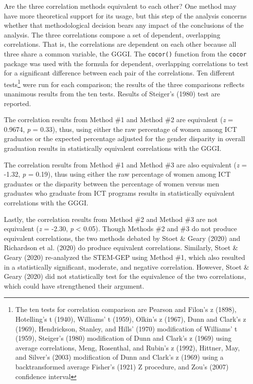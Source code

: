\documentclass[]{book}
\begin{document}
Are the three correlation methods equivalent to each other? One method
may have more theoretical support for its usage, but this step of the
analysis concerns whether that methodological decision bears any impact
of the conclusions of the analysis. The three correlations compose a set
of dependent, overlapping correlations. That is, the correlations are
dependent on each other because all three share a common variable, the
GGGI. The \texttt{cocor()} function from the \texttt{cocor} package
\citep{diedenhofenCocorComprehensiveSolution2015} was used with the
formula for dependent, overlapping correlations to test for a
significant difference between each pair of the correlations. Ten
different tests\footnote{The ten tests for correlation comparison are
  Pearson and Filon's z (1898), Hotelling's t (1940), Williams' t
  (1959), Olkin's z (1967), Dunn and Clark's z (1969), Hendrickson,
  Stanley, and Hills' (1970) modification of Williams' t (1959),
  Steiger's (1980) modification of Dunn and Clark's z (1969) using
  average correlations, Meng, Rosenthal, and Rubin's z (1992), Hittner,
  May, and Silver's (2003) modification of Dunn and Clark's z (1969)
  using a backtransformed average Fisher's (1921) Z procedure, and Zou's
  (2007) confidence interval} were run for each comparison; the results
of the three comparisons reflects unanimous results from the ten tests.
Results of Steiger's (1980) test are reported.

The correlation results from Method \#1 and Method \#2 are equivalent
(\emph{z} = 0.9674, \emph{p} = 0.33), thus, using either the raw
percentage of women among ICT graduates or the expected percentage
adjusted for the gender disparity in overall graduation results in
statistically equivalent correlations with the GGGI.

The correlation results from Method \#1 and Method \#3 are also
equivalent (\emph{z} = -1.32, \emph{p} = 0.19), thus using either the
raw percentage of women among ICT graduates or the disparity between the
percentage of women versus men graduates who graduate from ICT programs
results in statistically equivalent correlations with the GGGI.

Lastly, the correlation results from Method \#2 and Method \#3 are not
equivalent (\emph{z} = -2.30, \emph{p} \textless{} 0.05). Though Methods
\#2 and \#3 do not produce equivalent correlations, the two methods
debated by Stoet \& Geary (2020) and Richardson et al. (2020) do produce
equivalent correlations. Similarly, Stoet \& Geary (2020) re-analyzed
the STEM-GEP using Method \#1, which also resulted in a statistically
significant, moderate, and negative correlation. However, Stoet \& Geary
(2020) did not statistically test for the equivalence of the two
correlations, which could have strengthened their argument.
\end{document}
